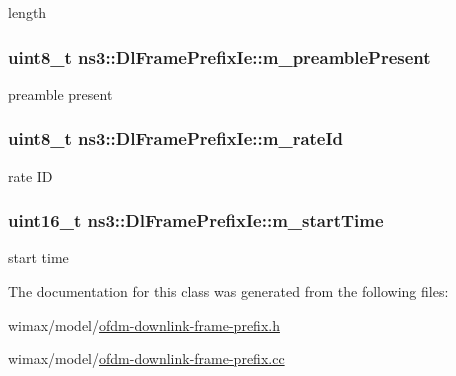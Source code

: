 length 

\subsubsection[{\texorpdfstring{m\+\_\+preamble\+Present}{m_preamblePresent}}]{\setlength{\rightskip}{0pt plus 5cm}uint8\+\_\+t ns3\+::\+Dl\+Frame\+Prefix\+Ie\+::m\+\_\+preamble\+Present\hspace{0.3cm}{\ttfamily [private]}}\hypertarget{classns3_1_1DlFramePrefixIe_a29e2165424da96b23e791e031ebc99fa}{}\label{classns3_1_1DlFramePrefixIe_a29e2165424da96b23e791e031ebc99fa}


preamble present 

\subsubsection[{\texorpdfstring{m\+\_\+rate\+Id}{m_rateId}}]{\setlength{\rightskip}{0pt plus 5cm}uint8\+\_\+t ns3\+::\+Dl\+Frame\+Prefix\+Ie\+::m\+\_\+rate\+Id\hspace{0.3cm}{\ttfamily [private]}}\hypertarget{classns3_1_1DlFramePrefixIe_a7ee2b805b0bb5ff17836c35b137319aa}{}\label{classns3_1_1DlFramePrefixIe_a7ee2b805b0bb5ff17836c35b137319aa}


rate ID 

\subsubsection[{\texorpdfstring{m\+\_\+start\+Time}{m_startTime}}]{\setlength{\rightskip}{0pt plus 5cm}uint16\+\_\+t ns3\+::\+Dl\+Frame\+Prefix\+Ie\+::m\+\_\+start\+Time\hspace{0.3cm}{\ttfamily [private]}}\hypertarget{classns3_1_1DlFramePrefixIe_a3ce62c0aa1b6efe951e43250d40c985a}{}\label{classns3_1_1DlFramePrefixIe_a3ce62c0aa1b6efe951e43250d40c985a}


start time 



The documentation for this class was generated from the following files\+:\begin{DoxyCompactItemize}
\item 
wimax/model/\hyperlink{ofdm-downlink-frame-prefix_8h}{ofdm-\/downlink-\/frame-\/prefix.\+h}\item 
wimax/model/\hyperlink{ofdm-downlink-frame-prefix_8cc}{ofdm-\/downlink-\/frame-\/prefix.\+cc}\end{DoxyCompactItemize}
